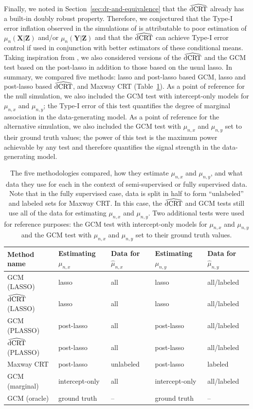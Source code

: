 \documentclass[12pt]{article}
\theoremstyle{definition}
\theoremstyle{remark}
\newcommand{\prx}{\bm X}								%
\newcommand{\prz}{\bm Z}								%
\newcommand{\pry}{{\bm Y}}								%
\newcommand{\dCRThat}{\widehat{\textnormal{dCRT}}}		%
\begin{document}
	Finally, we noted in Section~\ref{sec:dr-and-equivalence} that the $\dCRThat$ already has a built-in doubly robust property. Therefore, we conjectured that the Type-I error inflation observed in the simulations of \citet{Li2022} is attributable to poor estimation of $\mu_n(\prx|\prz)$ and/or $\mu_n(\pry|\prz)$ and that the $\dCRThat$ can achieve Type-I error control if used in conjunction with better estimators of these conditional means. Taking inspiration from \citet{Li2022}, we also considered versions of the $\dCRThat$ and the GCM test based on the post-lasso in addition to those based on the usual lasso. In summary, we compared five methods: lasso and post-lasso based GCM, lasso and post-lasso based $\dCRThat$, and Maxway CRT (Table~\ref{tab:methods-compared}). As a point of reference for the null simulation, we also included the GCM test with intercept-only models for $\mu_{n,x}$ and $\mu_{n,y}$; the Type-I error of this test quantifies the degree of marginal association in the data-generating model. As a point of reference for the alternative simulation, we also included the GCM test with $\mu_{n,x}$ and $\mu_{n,y}$ set to their ground truth values; the power of this test is the maximum power achievable by any test and therefore quantifies the signal strength in the data-generating model.
	
	\begin{table}[!ht]
		\centering
		\begin{tabular}{ lllll }
			Method name & Estimating $\mu_{n,x}$ & Data for $\widehat \mu_{n,x}$ & Estimating $\mu_{n,y}$ & Data for $\widehat \mu_{n,y}$\\ 
			\hline
			GCM (LASSO) & lasso & all & lasso & all/labeled \\
			$\dCRThat$ (LASSO) & lasso & all & lasso & all/labeled \\
			GCM (PLASSO) & post-lasso & all & post-lasso & all/labeled \\
			$\dCRThat$ (PLASSO) & post-lasso & all & post-lasso & all/labeled \\
			Maxway CRT & post-lasso & unlabeled & post-lasso & labeled \\
			\hline
			GCM (marginal) & intercept-only & all & intercept-only & all/labeled \\
			GCM (oracle) & ground truth & -- & ground truth & --
		\end{tabular}
		\caption{The five methodologies compared, how they estimate $\mu_{n,x}$ and $\mu_{n,y}$, and what data they use for each in the context of semi-supervised or fully supervised data. Note that in the fully supervised case, data is split in half to form ``unlabeled'' and labeled sets for Maxway CRT. In this case, the $\dCRThat$ and GCM tests still use all of the data for estimating $\mu_{n,x}$ and $\mu_{n,y}$. Two additional tests were used for reference purposes: the GCM test with intercept-only models for $\mu_{n,x}$ and $\mu_{n,y}$ and the GCM test with $\mu_{n,x}$ and $\mu_{n,y}$ set to their ground truth values.}
		\label{tab:methods-compared}
	\end{table}
	
\end{document}
